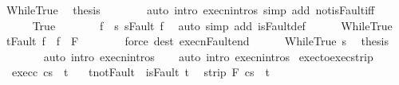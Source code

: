 \begin{isabellebody}
\ WhileTrue\ \isamarkupfalse%
\ {\isacharquery}thesis\isanewline
\ \ \ \ \ \ \isamarkupfalse%
\ {\isacharparenleft}auto\ intro{\isacharcolon}\ execn{\isachardot}intros\ simp\ add{\isacharcolon}\ not{\isacharunderscore}isFault{\isacharunderscore}iff{\isacharparenright}\isanewline
\ \ \isamarkupfalse%
\isanewline
\ \ \ \ \isamarkupfalse%
\ True\isanewline
\ \ \ \ \isamarkupfalse%
\ \isamarkupfalse%
\ f{\isacharprime}\ \ s{\isacharprime}{\isacharcolon}\ {\isachardoublequoteopen}s{\isacharprime}{\isacharequal}Fault\ f{\isacharprime}{\isachardoublequoteclose}\ \isamarkupfalse%
\ {\isacharparenleft}auto\ simp\ add{\isacharcolon}\ isFault{\isacharunderscore}def{\isacharparenright}\isanewline
\ \ \ \ \isamarkupfalse%
\ WhileTrue\ \isamarkupfalse%
\ {\isachardoublequoteopen}t{\isacharequal}Fault\ f{\isacharprime}{\isachardoublequoteclose}\ \ {\isachardoublequoteopen}f{\isacharprime}\ {\isasymnotin}\ F{\isachardoublequoteclose}\isanewline
\ \ \ \ \ \ \isamarkupfalse%
\ {\isacharparenleft}force\ dest{\isacharcolon}\ execn{\isacharunderscore}Fault{\isacharunderscore}end{\isacharparenright}\isanewline
\ \ \ \ \isamarkupfalse%
\ WhileTrue\ s{\isacharprime}\ \isamarkupfalse%
\ {\isacharquery}thesis\isanewline
\ \ \ \ \ \ \isamarkupfalse%
\ {\isacharparenleft}auto\ intro{\isacharcolon}\ execn{\isachardot}intros{\isacharparenright}\isanewline
\ \ \isamarkupfalse%
\isanewline
{}\isamarkupfalse%
\ {\isacharparenleft}auto\ intro{\isacharcolon}\ execn{\isachardot}intros{\isacharparenright}%
\endisatagproof
{\isafoldproof}%
%
\isadelimproof
\isanewline
%
\endisadelimproof
\isanewline
{}\isamarkupfalse%
\ exec{\isacharunderscore}to{\isacharunderscore}exec{\isacharunderscore}strip{\isacharcolon}\isanewline
\ \ exec{\isacharunderscore}c{\isacharcolon}\ {\isachardoublequoteopen}{\isasymGamma}{\isasymturnstile}{\isasymlangle}c{\isacharcomma}s{\isasymrangle}\ {\isasymRightarrow}\ t{\isachardoublequoteclose}\ \isanewline
\ \ t{\isacharunderscore}not{\isacharunderscore}Fault{\isacharcolon}\ {\isachardoublequoteopen}{\isasymnot}\ isFault\ t{\isachardoublequoteclose}\isanewline
\ \ {\isachardoublequoteopen}strip\ F\ {\isasymGamma}{\isasymturnstile}{\isasymlangle}c{\isacharcomma}s{\isasymrangle}\ {\isasymRightarrow}\ t{\isachardoublequoteclose}\isanewline

\end{isabellebody}
